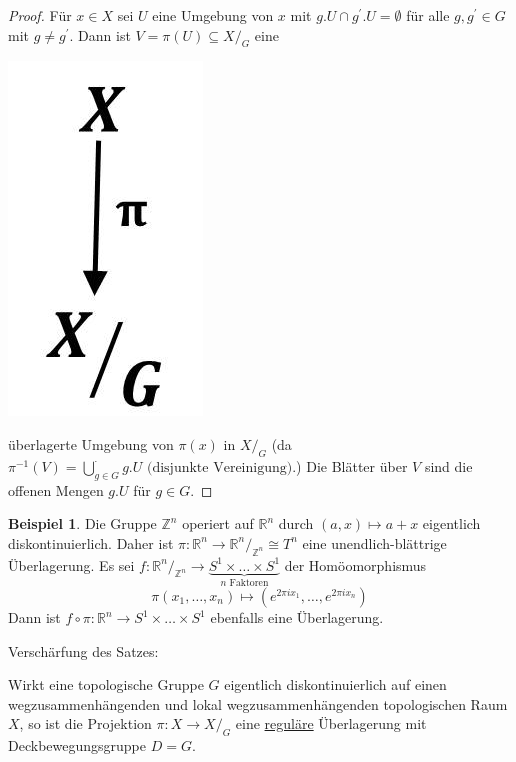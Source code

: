 \documentclass[a4paper,11pt,notitlepage]{report}
\theoremstyle{definition}
\newtheorem{example}{Beispiel}[chapter]
\newcommand{\R}{{\ensuremath{\mathbb{R}}}}
\newcommand{\Z}{{\ensuremath{\mathbb{Z}}}}
\begin{document}
\begin{proof}
	Für $x \in X$ sei $U$ eine Umgebung von $x$ mit $g.U \cap g^\prime.U = \emptyset$ für alle $g,g^\prime \in G$ mit $g \neq g^\prime$.
	\newline
	Dann ist $V = \pi(U) \subseteq X/_G$ eine \begin{center}
	\includegraphics[scale=0.5]{images/2012_01_09_Bild4.jpg}
\end{center} überlagerte Umgebung von $\pi(x)$ in $X/_G$ (da $\pi^{-1}(V) = \bigcup\limits_{g \in G}^\cdot {g.U} \text{ (disjunkte Vereinigung)}$.)
	\newline
	Die Blätter über $V$ sind die offenen Mengen $g.U$ für $g \in G$.
\end{proof}

\begin{example}
	Die Gruppe $\Z^n$ operiert auf $\R^n$ durch $(a,x) \mapsto a+x$ eigentlich diskontinuierlich.
	\newline
	Daher ist $\pi \colon \R^n \rightarrow \R^n /_{\Z^n} \cong T^n$ eine unendlich-blättrige Überlagerung.
	\newline
	Es sei $f \colon \R^n/_{\Z^n} \rightarrow \underbrace{S^1 \times \ldots \times S^1}_{n \text{ Faktoren}}$ der Homöomorphismus $$\pi(x_1, \ldots, x_n) \mapsto (e^{2 \pi i x_1}, \ldots, e^{2 \pi i x_n})$$
	Dann ist $f \circ \pi \colon \R^n \rightarrow S^1 \times \ldots \times S^1$ ebenfalls eine Überlagerung.
\end{example}
Verschärfung des Satzes:

\begin{theorem}
	Wirkt eine topologische Gruppe $G$ eigentlich diskontinuierlich auf einen wegzusammenhängenden und lokal wegzusammenhängenden topologischen Raum $X$, so ist die Projektion $\pi \colon X \rightarrow X/_G$ eine \underline{reguläre} Überlagerung mit Deckbewegungsgruppe $D=G$.
\end{theorem}
\end{document}

